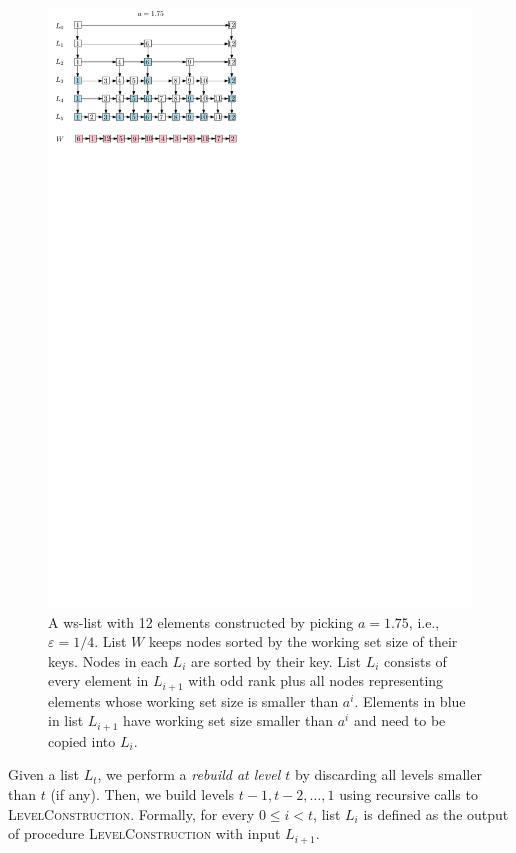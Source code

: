 \documentclass[11pt]{article}       %
\newcommand{\wlist}{ws-list\xspace}
\begin{document}
\begin{figure}[tb]
\centering
\includegraphics{img/wlist.pdf}
\caption{\small A \wlist with 12 elements constructed by picking $a = 1.75$, i.e., $\varepsilon = 1/4$. List $W$ keeps nodes sorted by the working set size of their keys. Nodes in each $L_i$ are sorted by their key. List $L_i$ consists of every element in $L_{i+1}$ with odd rank plus all nodes representing elements whose working set size is smaller than $a^i$. Elements in blue in list $L_{i+1}$ have working set size smaller than $a^i$ and need to be copied into $L_i$.}
\label{fig:Wlist}
\end{figure}

Given a list $L_t$, we perform a \emph{rebuild at level $t$} by discarding all levels smaller than $t$ (if any). 
Then, we build levels $t-1, t-2, \ldots, 1$ using recursive calls to \textsc{LevelConstruction}. 
Formally, for every $0\leq i< t$, list $L_i$ is defined as the output of procedure \textsc{LevelConstruction} with input $L_{i+1}$.
\end{document}

